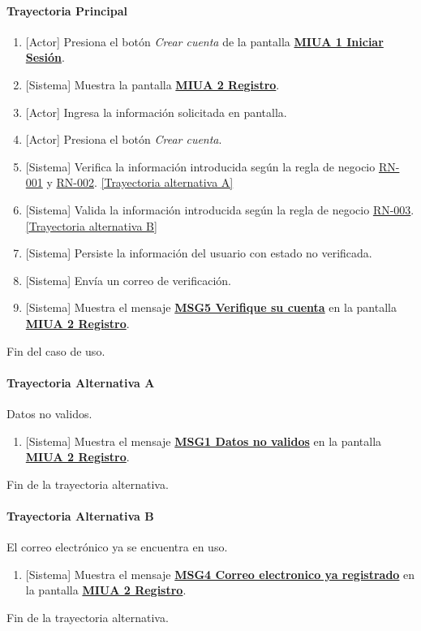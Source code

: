 \paragraph{Trayectoria Principal}
	\begin{enumerate}
	    \item {[Actor]} Presiona el botón \textit{Crear cuenta} de la pantalla \hyperref[fig:MIUA-1]{\bf MIUA 1 Iniciar Sesión}.
	    \item {[Sistema]} Muestra la pantalla \hyperref[fig:MIUA-2]{\bf MIUA 2 Registro}.
	    \item {[Actor]} Ingresa la información solicitada en pantalla.
	    \item {[Actor]} Presiona el botón \textit{Crear cuenta}.
	    \item {[Sistema]} Verifica la información introducida según la regla de negocio \hyperref[RN001]{RN-001} y \hyperref[RN002]{RN-002}. \hyperref[A-USR-CU1:TA]{[Trayectoria alternativa A]}
	    \item {[Sistema]} Valida la información introducida según la regla de negocio \hyperref[RN003]{RN-003}. \hyperref[A-USR-CU1:TB]{[Trayectoria alternativa B]}
	    \item {[Sistema]} Persiste la información del usuario con estado no verificada.
	    \item {[Sistema]} Envía un correo de verificación.
	    \item {[Sistema]} Muestra el mensaje \hyperref[MSG5]{\bf MSG5 Verifique su cuenta} en la pantalla \hyperref[fig:MIUA-2]{\bf MIUA 2 Registro}.
	\end{enumerate}
	Fin del caso de uso.

\paragraph{Trayectoria Alternativa A} \label{A-USR-CU1:TA}
	Datos no validos.
	\begin{enumerate}[label=A\arabic*.]
		\item {[Sistema]} Muestra el mensaje \hyperref[MSG1]{\bf MSG1 Datos no validos} en la pantalla \hyperref[fig:MIUA-2]{\bf MIUA 2 Registro}.
	\end{enumerate}
	Fin de la trayectoria alternativa.
\paragraph{Trayectoria Alternativa B} \label{A-USR-CU1:TB}
    El correo electrónico ya se encuentra en uso.
	\begin{enumerate}[label=B\arabic*.]
		\item {[Sistema]} Muestra el mensaje \hyperref[MSG4]{\bf MSG4 Correo electronico ya registrado} en la pantalla \hyperref[fig:MIUA-2]{\bf MIUA 2 Registro}.
	\end{enumerate}
	Fin de la trayectoria alternativa.